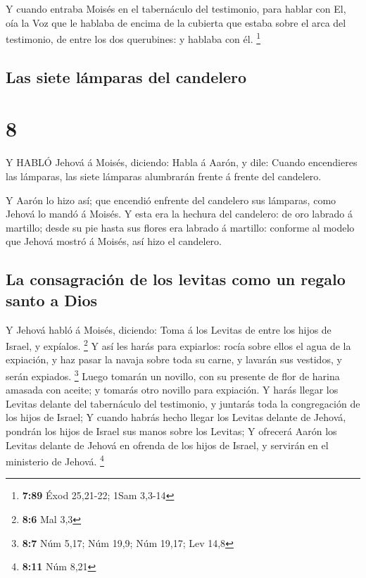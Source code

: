  Y cuando entraba Moisés en el tabernáculo del testimonio,
para hablar con El, oía la Voz que le hablaba de encima de la cubierta
que estaba sobre el arca del testimonio, de entre los dos querubines: y
hablaba con él. \footnote{\textbf{7:89} Éxod 25,21-22; 1Sam 3,3-14}

\hypertarget{las-siete-luxe1mparas-del-candelero}{%
\subsection{Las siete lámparas del
candelero}\label{las-siete-luxe1mparas-del-candelero}}

\hypertarget{section-7}{%
\section{8}\label{section-7}}

 Y HABLÓ Jehová á Moisés, diciendo:  Habla á
Aarón, y dile: Cuando encendieres las lámparas, las siete lámparas
alumbrarán frente á frente del candelero.

 Y Aarón lo hizo así; que encendió enfrente del candelero
sus lámparas, como Jehová lo mandó á Moisés.  Y esta era la
hechura del candelero: de oro labrado á martillo; desde su pie hasta sus
flores era labrado á martillo: conforme al modelo que Jehová mostró á
Moisés, así hizo el candelero.

\hypertarget{la-consagraciuxf3n-de-los-levitas-como-un-regalo-santo-a-dios}{%
\subsection{La consagración de los levitas como un regalo santo a
Dios}\label{la-consagraciuxf3n-de-los-levitas-como-un-regalo-santo-a-dios}}

 Y Jehová habló á Moisés, diciendo:  Toma á los
Levitas de entre los hijos de Israel, y expíalos. \footnote{\textbf{8:6}
  Mal 3,3}  Y así les harás para expiarlos: rocía sobre
ellos el agua de la expiación, y haz pasar la navaja sobre toda su
carne, y lavarán sus vestidos, y serán expiados. \footnote{\textbf{8:7}
  Núm 5,17; Núm 19,9; Núm 19,17; Lev 14,8}  Luego tomarán un
novillo, con su presente de flor de harina amasada con aceite; y tomarás
otro novillo para expiación.  Y harás llegar los Levitas
delante del tabernáculo del testimonio, y juntarás toda la congregación
de los hijos de Israel;  Y cuando habrás hecho llegar los
Levitas delante de Jehová, pondrán los hijos de Israel sus manos sobre
los Levitas;  Y ofrecerá Aarón los Levitas delante de
Jehová en ofrenda de los hijos de Israel, y servirán en el ministerio de
Jehová. \footnote{\textbf{8:11} Núm 8,21}

